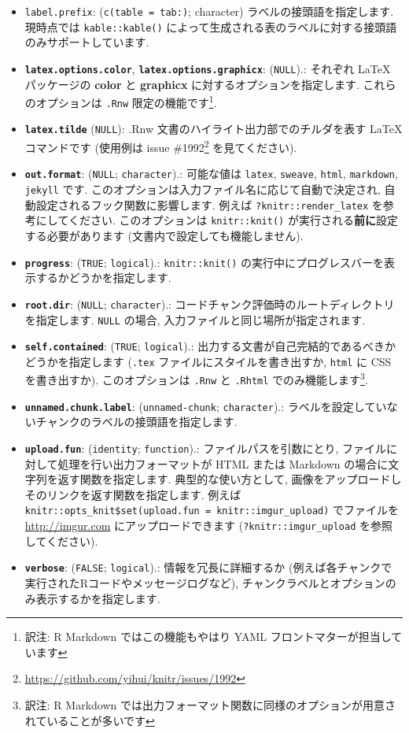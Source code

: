 \documentclass[
  11pt,
  lualatex,
  ja=standard]{bxjsreport}
\renewcommand{\href}[2]{#2\footnote{\url{#1}}}
\begin{document}
\begin{itemize}
\item
  \texttt{label.prefix}: (\texttt{c(table = \textquotesingle{}tab:\textquotesingle{})}; character) ラベルの接頭語を指定します. 現時点では \texttt{kable::kable()} によって生成される表のラベルに対する接頭語のみサポートしています.
\item
  \textbf{\texttt{latex.options.color}}, \textbf{\texttt{latex.options.graphicx}}: (\texttt{NULL}).: それぞれ LaTeX パッケージの \textbf{color} と \textbf{graphicx} に対するオプションを指定します. これらのオプションは \texttt{.Rnw} 限定の機能です\footnote{訳注: R Markdown ではこの機能もやはり YAML フロントマターが担当しています}.
\item
  \textbf{\texttt{latex.tilde}} (\texttt{NULL}): .Rnw 文書のハイライト出力部でのチルダを表す LaTeX コマンドです (使用例は issue \href{https://github.com/yihui/knitr/issues/1992}{\#1992} を見てください).
\item
  \textbf{\texttt{out.format}}: (\texttt{NULL}; \texttt{character}).: 可能な値は \texttt{latex}, \texttt{sweave}, \texttt{html}, \texttt{markdown}, \texttt{jekyll} です. このオプションは入力ファイル名に応じて自動で決定され, 自動設定されるフック関数に影響します. 例えば \texttt{?knitr::render\_latex} を参考にしてください. このオプションは \texttt{knitr::knit()} が実行される\textbf{前に}設定する必要があります (文書内で設定しても機能しません).
\item
  \textbf{\texttt{progress}}: (\texttt{TRUE}; \texttt{logical}).: \texttt{knitr::knit()} の実行中にプログレスバーを表示するかどうかを指定します.
\item
  \textbf{\texttt{root.dir}}: (\texttt{NULL}; \texttt{character}).: コードチャンク評価時のルートディレクトリを指定します. \texttt{NULL} の場合, 入力ファイルと同じ場所が指定されます.
\item
  \textbf{\texttt{self.contained}}: (\texttt{TRUE}; \texttt{logical}).: 出力する文書が自己完結的であるべきかどうかを指定します (\texttt{.tex} ファイルにスタイルを書き出すか, \texttt{html} に CSS を書き出すか). このオプションは \texttt{.Rnw} と \texttt{.Rhtml} でのみ機能します\footnote{訳注: R Markdown では出力フォーマット関数に同様のオプションが用意されていることが多いです}.
\item
  \textbf{\texttt{unnamed.chunk.label}}: (\texttt{unnamed-chunk}; \texttt{character}).: ラベルを設定していないチャンクのラベルの接頭語を指定します.
\item
  \textbf{\texttt{upload.fun}}: (\texttt{identity}; \texttt{function}).: ファイルパスを引数にとり, ファイルに対して処理を行い出力フォーマットが HTML または Markdown の場合に文字列を返す関数を指定します. 典型的な使い方として, 画像をアップロードしそのリンクを返す関数を指定します. 例えば \texttt{knitr::opts\_knit\$set(upload.fun = knitr::imgur\_upload)} でファイルを \url{http://imgur.com} にアップロードできます (\texttt{?knitr::imgur\_upload} を参照してください).
\item
  \textbf{\texttt{verbose}}: (\texttt{FALSE}; \texttt{logical}).: 情報を冗長に詳細するか (例えば各チャンクで実行されたRコードやメッセージログなど), チャンクラベルとオプションのみ表示するかを指定します.
\end{itemize}

\backmatter



\printbibliography[title=参考文献,heading=bibintoc]


\printindex
\end{document}
